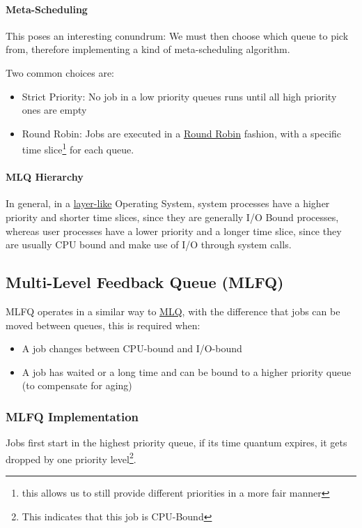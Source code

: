 \documentclass[openright, twoside]{report}
\theoremstyle{definition}
\theoremstyle{example}
\begin{document}
	\paragraph{Meta-Scheduling} 
		This poses an interesting conundrum: We must then choose which queue to pick from,
		therefore implementing a kind of meta-scheduling algorithm.

		Two common choices are:
		\begin{itemize}
			\item Strict Priority: No job in a low priority queues runs until all high
			priority ones are empty
			\item Round Robin: Jobs are executed in a \hyperref[ssec:RR]{Round Robin} fashion,
			with a specific time slice\footnote{this allows us to still provide different
			priorities in a more fair manner} for each queue.
		\end{itemize}

	\paragraph{MLQ Hierarchy}
	\label{par:MLQ_h}
		In general, in a \hyperref[par:OS_layer]{layer-like} Operating System,
		system processes have a higher priority and shorter time slices, since they are
		generally I/O Bound processes, whereas user processes have a lower priority and a 
		longer time slice, since they are usually CPU bound and make use of I/O through 
		system calls. 


	\subsection{Multi-Level Feedback Queue (MLFQ)}
	\label{ssec:MLFQ}
		MLFQ operates in a similar way to \hyperref[ssec:MLQ]{MLQ}, with the difference
		that jobs can be moved between queues, this is required when:
		\begin{itemize}
			\item A job changes between CPU-bound and I/O-bound
			\item A job has waited or a long time and can be bound to a higher priority
			queue (to compensate for aging)
		\end{itemize}

		\subsubsection{MLFQ Implementation}
		Jobs first start in the highest priority queue, if its time quantum expires,
		it gets dropped by one priority level\footnote{This indicates that this job
		is CPU-Bound}.
\end{document}
